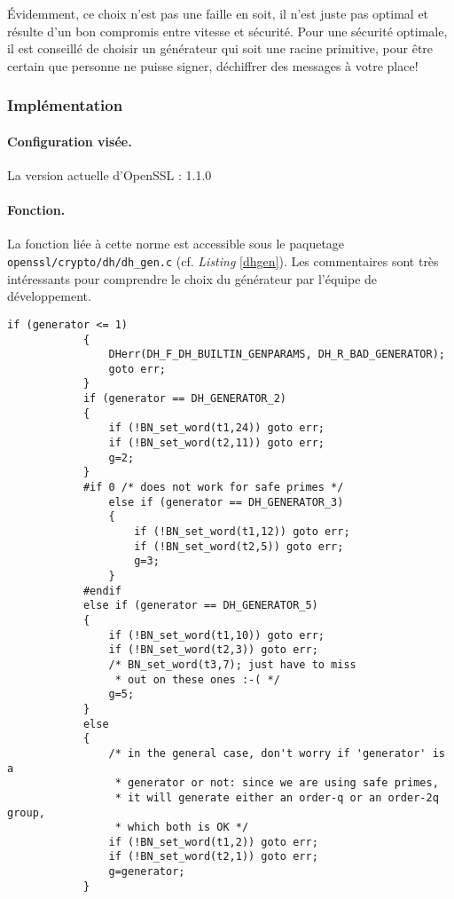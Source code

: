 		Évidemment, ce choix n'est pas une faille en soit, il n'est juste pas optimal et résulte d'un bon compromis entre vitesse et sécurité. Pour une sécurité optimale, il est conseillé de choisir un générateur qui soit une racine primitive, pour être certain que personne ne puisse signer, déchiffrer des messages à votre place!\\
	
	
		\subsubsection{Implémentation}
		
		\paragraph{Configuration visée.\\}

		La version actuelle d'OpenSSL : 1.1.0
		
		\paragraph{Fonction.\\}
		La fonction liée à cette norme est accessible sous le paquetage \texttt{openssl/crypto/dh/dh\_gen.c} (cf. \textit{Listing} \ref{dhgen}). Les commentaires sont très intéressants pour comprendre le choix du générateur par l'équipe de développement.
		
		
		\begin{lstlisting}[style=customc,caption=dh\_gen.c, label=dhgen]
			if (generator <= 1)
			{
				DHerr(DH_F_DH_BUILTIN_GENPARAMS, DH_R_BAD_GENERATOR);
				goto err;
			}
			if (generator == DH_GENERATOR_2)
			{
				if (!BN_set_word(t1,24)) goto err;
				if (!BN_set_word(t2,11)) goto err;
				g=2;
			}
			#if 0 /* does not work for safe primes */
				else if (generator == DH_GENERATOR_3)
				{
					if (!BN_set_word(t1,12)) goto err;
					if (!BN_set_word(t2,5)) goto err;
					g=3;
				}
			#endif
			else if (generator == DH_GENERATOR_5)
			{
				if (!BN_set_word(t1,10)) goto err;
				if (!BN_set_word(t2,3)) goto err;
				/* BN_set_word(t3,7); just have to miss
				 * out on these ones :-( */
				g=5;
			}
			else
			{
				/* in the general case, don't worry if 'generator' is a
				 * generator or not: since we are using safe primes,
				 * it will generate either an order-q or an order-2q group,
				 * which both is OK */
				if (!BN_set_word(t1,2)) goto err;
				if (!BN_set_word(t2,1)) goto err;
				g=generator;
			}
		\end{lstlisting}
		

